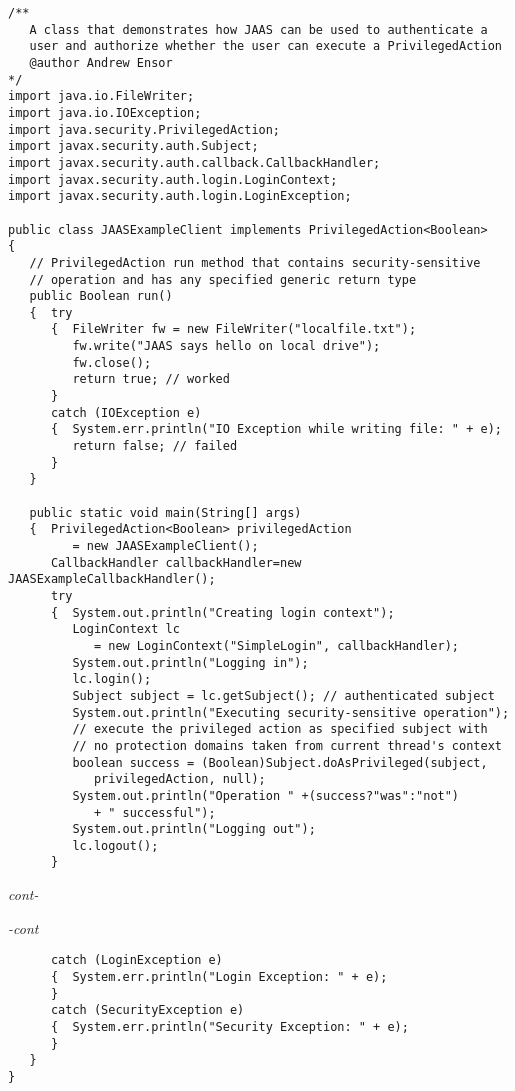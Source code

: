 \begin{figure*}\begin{program}\begin{verbatim}
/**
   A class that demonstrates how JAAS can be used to authenticate a
   user and authorize whether the user can execute a PrivilegedAction
   @author Andrew Ensor
*/
import java.io.FileWriter;
import java.io.IOException;
import java.security.PrivilegedAction;
import javax.security.auth.Subject;
import javax.security.auth.callback.CallbackHandler;
import javax.security.auth.login.LoginContext;
import javax.security.auth.login.LoginException;

public class JAASExampleClient implements PrivilegedAction<Boolean>
{
   // PrivilegedAction run method that contains security-sensitive
   // operation and has any specified generic return type
   public Boolean run()
   {  try
      {  FileWriter fw = new FileWriter("localfile.txt");
         fw.write("JAAS says hello on local drive");
         fw.close();
         return true; // worked
      }
      catch (IOException e)
      {  System.err.println("IO Exception while writing file: " + e);
         return false; // failed
      }
   }

   public static void main(String[] args)
   {  PrivilegedAction<Boolean> privilegedAction
         = new JAASExampleClient();
      CallbackHandler callbackHandler=new JAASExampleCallbackHandler();
      try
      {  System.out.println("Creating login context");
         LoginContext lc
            = new LoginContext("SimpleLogin", callbackHandler);
         System.out.println("Logging in");
         lc.login();
         Subject subject = lc.getSubject(); // authenticated subject
         System.out.println("Executing security-sensitive operation");
         // execute the privileged action as specified subject with
         // no protection domains taken from current thread's context
         boolean success = (Boolean)Subject.doAsPrivileged(subject,
            privilegedAction, null);
         System.out.println("Operation " +(success?"was":"not")
            + " successful");
         System.out.println("Logging out");
         lc.logout();
      }
\end{verbatim}\hfill \emph{cont-}\end{program}\end{figure*}%
\begin{figure*}\begin{program}\emph{-cont}\begin{verbatim}
      catch (LoginException e)
      {  System.err.println("Login Exception: " + e);
      }
      catch (SecurityException e)
      {  System.err.println("Security Exception: " + e);
      }
   }
}
\end{verbatim}\end{program}\end{figure*}
